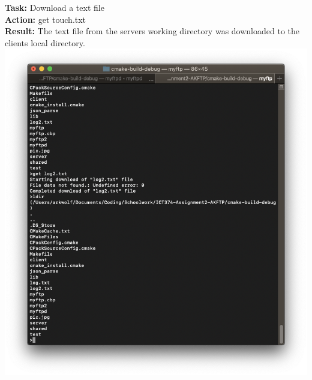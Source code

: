 \documentclass{article}
\begin{document}
\textbf{Task:} Download a text file\\
\textbf{Action:} get touch.txt\\
\textbf{Result:} The text file from the servers working directory was downloaded to the clients local directory.\\
\includegraphics[width=\textwidth]{testpictures/gettext}
\end{document}
